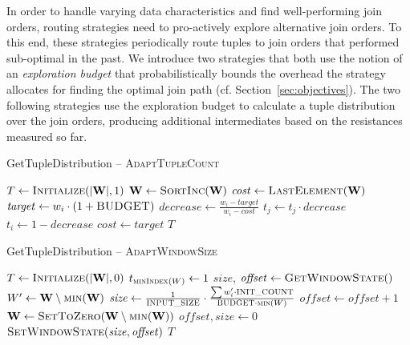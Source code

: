 In order to handle varying data characteristics and find well-per\-form\-ing join orders, routing strategies need to pro-actively explore alternative join orders. To this end, these strategies periodically route tuples to join orders that performed sub-optimal in the past. We introduce two strategies that both use the notion of an \emph{exploration budget} that probabilistically bounds the overhead the strategy allocates for finding the optimal join path (cf. Section~\ref{sec:objectives}). The two following strategies use the exploration budget to calculate a tuple distribution over the join orders, producing additional intermediates based on the resistances measured so far.

\begin{algorithm}[!t] \small
\caption{GetTupleDistribution -- \textsc{AdaptTupleCount}}\label{alg:adapt_tuple_count}
\begin{algorithmic}[1]
\State $T \gets \textsc{Initialize}(\lvert \mathbf{W}\rvert, 1)$
\State $\mathbf{W} \gets \textsc{SortInc}(\mathbf{W})$
\State $\mathit{cost} \gets \textsc{LastElement}(\mathbf{W})$
    \State $\mathit{target} \gets w_i \cdot (1 + \textsc{BUDGET})$
    \State $\mathit{decrease} \gets \frac{w_i - \mathit{target}}{w_i - \mathit{cost}}$
        \State $t_j \gets t_j \cdot \mathit{decrease}$
    \EndFor
    \State $t_i \gets 1 - \mathit{decrease}$
    \State $\mathit{cost} \gets \mathit{target}$
\EndFor
\State\Return $T$
\end{algorithmic}
\end{algorithm}


\begin{algorithm}[!t] \small
\caption{GetTupleDistribution -- \textsc{AdaptWindowSize}}\label{alg:adapt_window_size}
\begin{algorithmic}[1]
\State $T \gets \textsc{Initialize}(\lvert \mathbf{W}\rvert, 0)$
\State $t_{\textsc{minIndex}(W)} \gets 1$ 
\State $\mathit{size}$, $\mathit{offset} \gets \textsc{GetWindowState}()$
 
    \State $W^{\prime} \gets \mathbf{W} \setminus \textsc{min}(\mathbf{W})$
    \State $\mathit{size} \gets \frac{1}{\textsc{INPUT\_SIZE}} \cdot \frac{\sum w^{\prime}_i \cdot \textsc{INIT\_COUNT}}{\textsc{BUDGET} \cdot \textsc{min}(W)}$
\EndIf
{}
    \State $\mathit{offset} \gets \mathit{offset} + 1$
\Else {}
    \State $\mathbf{W} \gets \textsc{SetToZero}(\mathbf{W} \setminus \textsc{min}(\mathbf{W}))$ 
    \State $\mathit{offset}, \mathit{size} \gets 0$
\EndIf
\State $\textsc{SetWindowState}(\mathit{size}, \mathit{offset})$
\State\Return $T$
\end{algorithmic}
\end{algorithm}

